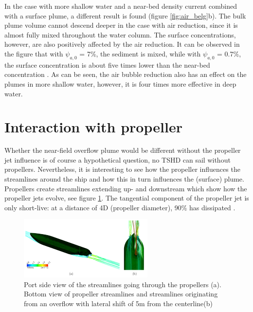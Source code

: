 \noindent In the case with more shallow water and a near-bed density current combined with a surface plume, a different result is found (figure \ref{fig:air_belg}b). The bulk plume volume cannot descend deeper in the case with air reduction, since it is almost fully mixed throughout the water column. The surface concentrations, however, are also positively affected by the air reduction. It can be observed in the figure that with $\psi_{a,0}$ = 7\%, the sediment is mixed, while with $\psi_{a,0}$ = 0.7\%, the surface concentration is about five times lower than the near-bed concentration \citep{Decrop}. As can be seen, the air bubble reduction also has an effect on the plumes in more shallow water, however, it is four times more effective in deep water.















\section{Interaction with propeller}
\label{sec:propeller}

Whether the near-field overflow plume would be different without the propeller jet influence is of course a hypothetical question, no TSHD can sail without propellers. Nevertheless, it is interesting to see how the propeller influences the streamlines around the ship and how this in turn influences the (surface) plume. \newline \noindent Propellers create streamlines extending up- and downstream which show how the propeller jets evolve, see figure \ref{fig:Propeller_belg}. The tangential component of the propeller jet is only short-live: at a distance of 4D (propeller diameter), 90\% has dissipated \citep{Decrop}. 

\begin{figure}[ht!]
    \centering
    \includegraphics[width = 0.6\textwidth]{Images/Propeller_belg.png}
    \caption{Port side view of the streamlines going through the propellers (a). Bottom view of propeller streamlines and streamlines originating from an overflow with lateral shift of 5m from the centerline(b)}
    \label{fig:Propeller_belg}
\end{figure}

